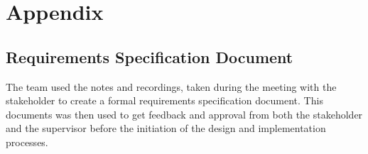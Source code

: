 \documentclass{l3proj}
\begin{document}
\chapter{Appendix}
\label{appendix}
\section{Requirements Specification Document}
\par
The team used the notes and recordings, taken during the meeting with the stakeholder to create a formal requirements specification document. This documents was then used to get feedback and approval from both the stakeholder and the supervisor before the initiation of the design and implementation processes.
\end{document}

